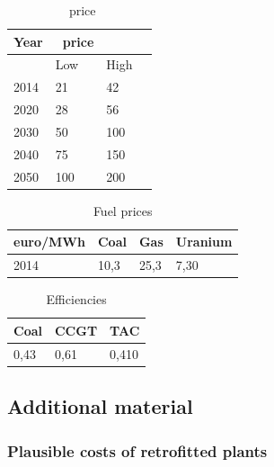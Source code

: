 \begin{table}
	\centering
	\caption{\coo\ price}
	\label{tab:CO2_price}
	\begin{tabular}{llll}
		\toprule
		Year & \coo\ price & & \\
		\midrule
		& Low & High \\
		2014 & 21 & 42 \\
		2020 & 28 & 56 \\
		2030 & 50 & 100 \\
		2040 & 75 & 150 \\
		2050 & 100 & 200 \\
		\bottomrule
	\end{tabular}
\end{table}



\begin{table}[!ht]
	\centering
	\caption{Fuel prices}
	\label{tab:Fuel_prices}
	\begin{tabular}{llll}
		\toprule
		euro/MWh & Coal & Gas & Uranium \\
		\midrule
		2014 & 10,3 & 25,3 & 7,30 \\
		\bottomrule
	\end{tabular}
\end{table}

\begin{table}
	\centering
	\caption{Efficiencies}
	\label{tab:Efficiencies}
	\begin{tabular}{lll}
		\toprule
		Coal & CCGT & TAC \\
		\midrule
		0,43 & 0,61 & 0,410 \\
		\bottomrule
	\end{tabular}
\end{table}

\clearpage
\subsection{Additional material}

\subsubsection{Plausible costs of retrofitted plants}

